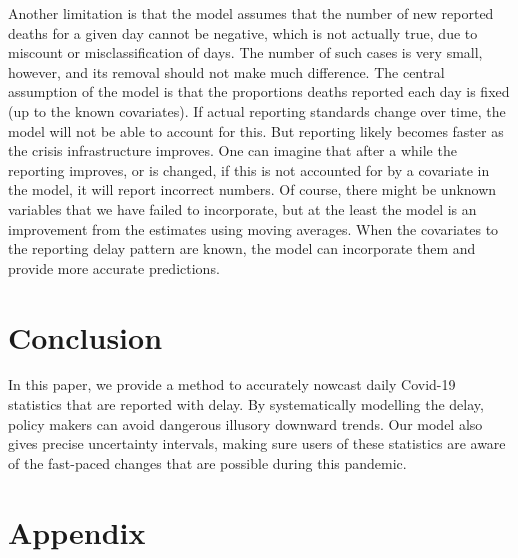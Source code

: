 \documentclass[a4paper,11pth]{article}
\begin{document}
Another limitation is that the model assumes that the number of new reported deaths for a given day cannot be negative, which is not actually true, due to miscount or misclassification of days. The number of such cases is very small, however, and its removal should not make much difference. The central assumption of the model is that the proportions deaths reported each day is fixed (up to the known covariates). If actual reporting standards change over time, the model will not be able to account for this. But reporting likely becomes faster as the crisis infrastructure improves. One can imagine that after a while the reporting improves, or is changed, if this is not accounted for by a covariate in the model, it will report incorrect numbers. Of course, there might be unknown variables that we have failed to incorporate, but at the least the model is an improvement from the estimates using moving averages. When the covariates to the reporting delay pattern are known, the model can incorporate them and provide more accurate predictions. 

\section{Conclusion}
In this paper, we provide a method to accurately nowcast daily Covid-19 statistics that are reported with delay. By systematically modelling the delay, policy makers can avoid dangerous illusory downward trends. Our model also gives precise uncertainty intervals, making sure users of these statistics are aware of the fast-paced changes that are possible during this pandemic.



\appendix
\section{Appendix}
%
\end{document}
